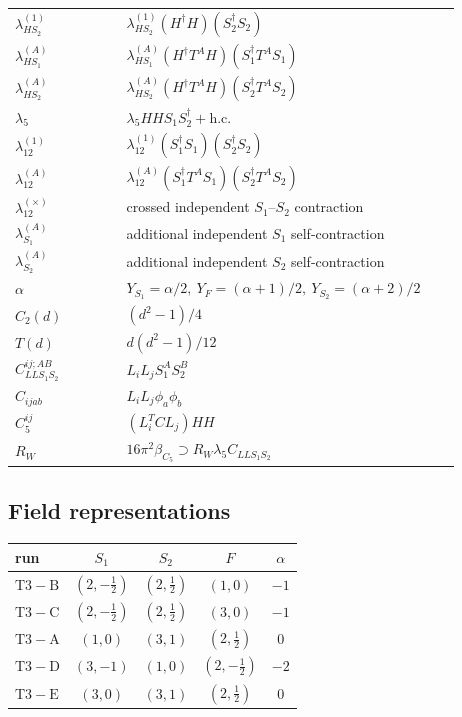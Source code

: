 \documentclass[9pt]{article}
\begin{document}
\begin{longtable}{@{}p{0.23\linewidth}p{0.69\linewidth}@{}}
$\lambda_{HS_2}^{(1)}$ & $\lambda_{HS_2}^{(1)}(H^\dagger H)(S_2^\dagger S_2)$ \\
$\lambda_{HS_1}^{(A)}$ & $\lambda_{HS_1}^{(A)}(H^\dagger T^AH)(S_1^\dagger T^AS_1)$ \\
$\lambda_{HS_2}^{(A)}$ & $\lambda_{HS_2}^{(A)}(H^\dagger T^AH)(S_2^\dagger T^AS_2)$ \\
$\lambda_5$ & $\lambda_5HHS_1S_2^\dagger+\mathrm{h.c.}$ \\
$\lambda_{12}^{(1)}$ & $\lambda_{12}^{(1)}(S_1^\dagger S_1)(S_2^\dagger S_2)$ \\
$\lambda_{12}^{(A)}$ & $\lambda_{12}^{(A)}(S_1^\dagger T^AS_1)(S_2^\dagger T^AS_2)$ \\
$\lambda_{12}^{(\times)}$ & crossed independent $S_1$--$S_2$ contraction \\
$\lambda_{S_1}^{(A)}$ & additional independent $S_1$ self-contraction \\
$\lambda_{S_2}^{(A)}$ & additional independent $S_2$ self-contraction \\
$\alpha$ & $Y_{S_1}=\alpha/2,\ Y_F=(\alpha+1)/2,\ Y_{S_2}=(\alpha+2)/2$ \\
$C_2(d)$ & $(d^2-1)/4$ \\
$T(d)$ & $d(d^2-1)/12$ \\
$C_{LLS_1S_2}^{ij;AB}$ & $L_iL_jS_1^AS_2^B$ \\
$C_{ijab}$ & $L_iL_j\phi_a\phi_b$ \\
$C_5^{ij}$ & $(L_i^TCL_j)HH$ \\
$R_W$ & $16\pi^2\beta_{C_5}\supset R_W\lambda_5C_{LLS_1S_2}$ \\
\bottomrule
\end{longtable}
\subsection*{Field representations}
\begin{longtable}{@{}lcccc@{}}
\toprule
run & $S_1$ & $S_2$ & $F$ & $\alpha$ \\
\midrule
$\mathrm{T3-B}$ & $(2,- \frac{1}{2})$ & $(2,\frac{1}{2})$ & $(1,0)$ & $-1$ \\
$\mathrm{T3-C}$ & $(2,- \frac{1}{2})$ & $(2,\frac{1}{2})$ & $(3,0)$ & $-1$ \\
$\mathrm{T3-A}$ & $(1,0)$ & $(3,1)$ & $(2,\frac{1}{2})$ & $0$ \\
$\mathrm{T3-D}$ & $(3,-1)$ & $(1,0)$ & $(2,- \frac{1}{2})$ & $-2$ \\
$\mathrm{T3-E}$ & $(3,0)$ & $(3,1)$ & $(2,\frac{1}{2})$ & $0$ \\
\bottomrule
\end{longtable}
\end{document}
